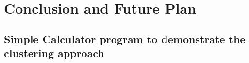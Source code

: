 \documentclass{uofsthesis-cs}
\begin{document}
\chapter{Conclusion and Future Plan}









%

\uofsappendix

\begin{appendices}

\chapter{Simple Calculator program to demonstrate the clustering approach}
\label{appendix:calculator}



\end{appendices}
\end{document}
